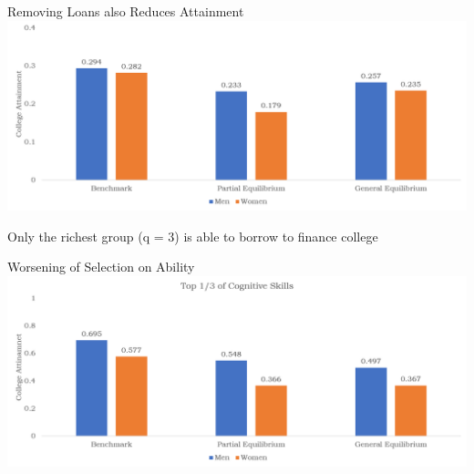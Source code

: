 \documentclass{beamer}
\begin{document}

\begin{frame}{Removing Loans also Reduces Attainment}
\includegraphics[width=\textwidth]{loansattain.png}

Only the richest group (q = 3) is able to borrow to finance college
\end{frame}

\begin{frame}{Worsening of Selection on Ability}
\includegraphics[width=\textwidth]{loansskills.png}
\end{frame}
\end{document}
